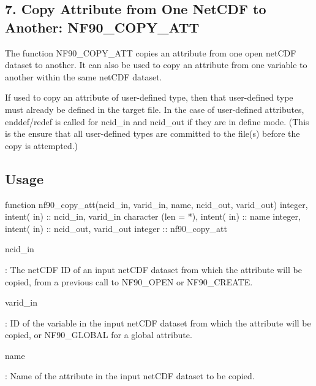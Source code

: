 \hypertarget{f90-attributes_f90-copy-attribute-from-one-netcdf-to-another-nf90_copy_att}{}\subsection{7. Copy Attribute from One Net\+C\+D\+F to Another\+: N\+F90\+\_\+\+C\+O\+P\+Y\+\_\+\+A\+T\+T }\label{f90-attributes_f90-copy-attribute-from-one-netcdf-to-another-nf90_copy_att}
The function N\+F90\+\_\+\+C\+O\+P\+Y\+\_\+\+A\+TT copies an attribute from one open net\+C\+DF dataset to another. It can also be used to copy an attribute from one variable to another within the same net\+C\+DF dataset.

If used to copy an attribute of user-\/defined type, then that user-\/defined type must already be defined in the target file. In the case of user-\/defined attributes, enddef/redef is called for ncid\+\_\+in and ncid\+\_\+out if they are in define mode. (This is the ensure that all user-\/defined types are committed to the file(s) before the copy is attempted.)

\subsection*{Usage}


\begin{DoxyCode}
\textcolor{keyword}{function }nf90\_copy\_att(ncid\_in, varid\_in, name, ncid\_out, varid\_out)
  \textcolor{keywordtype}{integer},             \textcolor{keywordtype}{intent( in)} :: ncid\_in,  varid\_in
  \textcolor{keywordtype}{character (len = *)}, \textcolor{keywordtype}{intent( in)} :: name
  \textcolor{keywordtype}{integer},             \textcolor{keywordtype}{intent( in)} :: ncid\_out, varid\_out
  \textcolor{keywordtype}{integer}                          :: nf90\_copy\_att
\end{DoxyCode}


{\ttfamily ncid\+\_\+in}

\+: The net\+C\+DF ID of an input net\+C\+DF dataset from which the attribute will be copied, from a previous call to N\+F90\+\_\+\+O\+P\+EN or N\+F90\+\_\+\+C\+R\+E\+A\+TE.

{\ttfamily varid\+\_\+in}

\+: ID of the variable in the input net\+C\+DF dataset from which the attribute will be copied, or N\+F90\+\_\+\+G\+L\+O\+B\+AL for a global attribute.

{\ttfamily name}

\+: Name of the attribute in the input net\+C\+DF dataset to be copied.

